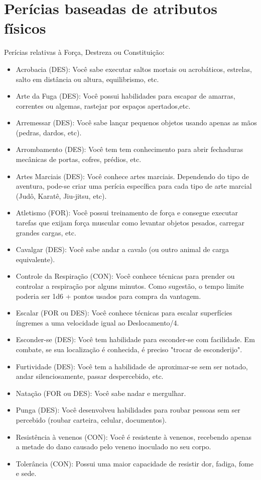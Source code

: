 \section{\label{sec:perFisicos}Perícias baseadas de atributos físicos}
Perícias relativas à Força, Destreza ou Constituição:
\begin{itemize}
	\item Acrobacia (DES): Você sabe executar saltos mortais ou acrobáticos, estrelas, salto em distância ou altura, equilibrismo, etc.
	\item Arte da Fuga (DES): Você possui habilidades para escapar de amarras, correntes ou algemas, rastejar por espaços apertados,etc.
	\item Arremessar (DES): Você sabe lançar pequenos objetos usando apenas as mãos (pedras, dardos, etc).
	\item Arrombamento (DES): Você tem tem conhecimento para abrir fechaduras mecânicas de portas, cofres, prédios, etc.
	\item Artes Marciais (DES): Você conhece artes marciais. Dependendo do tipo de aventura, pode-se criar uma perícia específica para cada tipo de arte marcial (Judô, Karatê, Jiu-jitsu, etc).
	\item Atletismo (FOR): Você possui treinamento de força e consegue executar tarefas que exijam força muscular como levantar objetos pesados, carregar grandes cargas, etc.
	\item Cavalgar (DES): Você sabe andar a cavalo (ou outro animal de carga equivalente).
	\item Controle da Respiração (CON): Você conhece técnicas para prender ou controlar a respiração por alguns minutos. Como sugestão, o tempo limite poderia ser 1d6 + pontos usados para compra da vantagem.
	\item Escalar (FOR ou DES): Você conhece técnicas para escalar superfícies íngremes a uma velocidade igual ao Deslocamento/4.
	\item Esconder-se (DES): Você tem habilidade para esconder-se com facilidade. Em combate, se sua localização é conhecida, é preciso "trocar de esconderijo".
	\item Furtividade (DES): Você tem a habilidade de aproximar-se sem ser notado, andar silenciosamente, passar despercebido, etc.
	\item Natação (FOR ou DES): Você sabe nadar e mergulhar.
	\item Punga (DES): Você desenvolveu habilidades para roubar pessoas sem ser percebido (roubar carteira, celular, documentos).
	\item Resistência à venenos (CON): Você é resistente à venenos, recebendo apenas a metade do dano causado pelo veneno inoculado no seu corpo.
	\item Tolerância (CON): Possui uma maior capacidade de resistir dor, fadiga, fome e sede.
\end{itemize}


